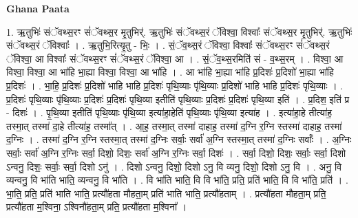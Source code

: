 \documentclass[17pt]{extarticle}
\begin{document}
\textbf{Ghana Paata } \newline

1. ऋ॒तुभिः॑ संॅवथ्स॒रꣳ सं॑ॅवथ्स॒र मृ॒तुभिर्॑. ऋ॒तुभिः॑ संॅवथ्स॒रं ॅविश्वा॒ विश्वाः᳚ संॅवथ्स॒र मृ॒तुभिर्॑. ऋ॒तुभिः॑ संॅवथ्स॒रं ॅविश्वाः᳚ । . ऋ॒तुभि॒रित्यृ॒तु - भिः॒ । . सं॒ॅव॒थ्स॒रं ॅविश्वा॒ विश्वाः᳚ संॅवथ्स॒रꣳ सं॑ॅवथ्स॒रं ॅविश्वा॒ आ विश्वाः᳚ संॅवथ्स॒रꣳ सं॑ॅवथ्स॒रं ॅविश्वा॒ आ । . सं॒ॅव॒थ्स॒रमिति॑ सं - व॒थ्स॒रम् । . विश्वा॒ आ विश्वा॒ विश्वा॒ आ भा॑हि भा॒ह्या विश्वा॒ विश्वा॒ आ भा॑हि । . आ भा॑हि भा॒ह्या भा॑हि प्र॒दिशः॑ प्र॒दिशो॑ भा॒ह्या भा॑हि प्र॒दिशः॑ । . भा॒हि॒ प्र॒दिशः॑ प्र॒दिशो॑ भाहि भाहि प्र॒दिशः॑ पृथि॒व्याः पृ॑थि॒व्याः प्र॒दिशो॑ भाहि भाहि प्र॒दिशः॑ पृथि॒व्याः । . प्र॒दिशः॑ पृथि॒व्याः पृ॑थि॒व्याः प्र॒दिशः॑ प्र॒दिशः॑ पृथि॒व्या इतीति॑ पृथि॒व्याः प्र॒दिशः॑ प्र॒दिशः॑ पृथि॒व्या इति॑ । . प्र॒दिश॒ इति॑ प्र - दिशः॑ । . पृ॒थि॒व्या इतीति॑ पृथि॒व्याः पृ॑थि॒व्या इत्या॑हा॒हेति॑ पृथि॒व्याः पृ॑थि॒व्या इत्या॑ह । . इत्या॑हा॒हे तीत्या॑ह॒ तस्मा॒त् तस्मा॑ दा॒हे तीत्या॑ह॒ तस्मा᳚त् । . आ॒ह॒ तस्मा॒त् तस्मा॑ दाहाह॒ तस्मा॑ द॒ग्नि र॒ग्नि स्तस्मा॑ दाहाह॒ तस्मा॑ द॒ग्निः । . तस्मा॑ द॒ग्नि र॒ग्नि स्तस्मा॒त् तस्मा॑ द॒ग्निः सर्वाः॒ सर्वा॑ अ॒ग्नि स्तस्मा॒त् तस्मा॑ द॒ग्निः सर्वाः᳚ । . अ॒ग्निः सर्वाः॒ सर्वा॑ अ॒ग्नि र॒ग्निः सर्वा॒ दिशो॒ दिशः॒ सर्वा॑ अ॒ग्नि र॒ग्निः सर्वा॒ दिशः॑ । . सर्वा॒ दिशो॒ दिशः॒ सर्वाः॒ सर्वा॒ दिशो ऽन्वनु॒ दिशः॒ सर्वाः॒ सर्वा॒ दिशो ऽनु॑ । . दिशो ऽन्वनु॒ दिशो॒ दिशो ऽनु॒ वि व्यनु॒ दिशो॒ दिशो ऽनु॒ वि । . अनु॒ वि व्यन्वनु॒ वि भा॑ति भाति॒ व्यन्वनु॒ वि भा॑ति । . वि भा॑ति भाति॒ वि वि भा॑ति॒ प्रति॒ प्रति॑ भाति॒ वि वि भा॑ति॒ प्रति॑ । . भा॒ति॒ प्रति॒ प्रति॑ भाति भाति॒ प्रत्यौ॑हता मौहता॒म् प्रति॑ भाति भाति॒ प्रत्यौ॑हताम् । . प्रत्यौ॑हता मौहता॒म् प्रति॒ प्रत्यौ॑हता म॒श्विना॒ ऽश्विनौ॑हता॒म् प्रति॒ प्रत्यौ॑हता म॒श्विना᳚ । \newline
\end{document}
